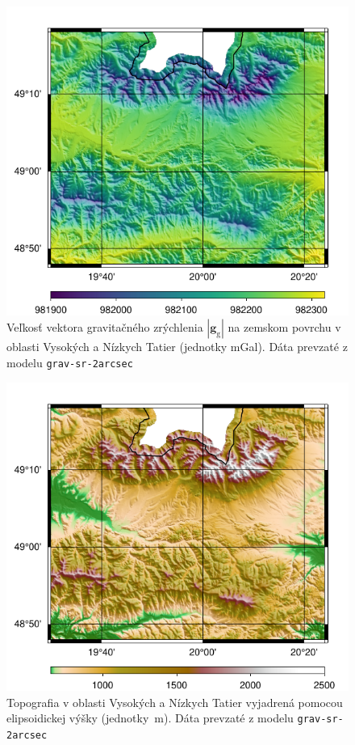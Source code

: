 \documentclass[a4paper, 12pt]{book}
\newcommand{\gidx}{\mathrm g}
\let\vec\mathbf
\begin{document}
\begin{figure}
\centering
\includegraphics{./fig-gg-grav-sr-2arcsec.pdf}
\caption{Veľkosť vektora gravitačného zrýchlenia $| \vec g_\gidx |$ na zemskom 
povrchu v oblasti Vysokých a Nízkych Tatier (jednotky mGal).  Dáta prevzaté 
z modelu \texttt{grav-sr-2arcsec} \citep{GravSR2arcsec}}
\label{fig:gg_grav_sr_2arcsec}
\end{figure}

\begin{figure}
\centering
\includegraphics{./fig-h-grav-sr-2arcsec.pdf}
\caption{Topografia v oblasti Vysokých a Nízkych Tatier vyjadrená pomocou 
elipsoidickej výšky (jednotky~m).  Dáta prevzaté z modelu 
\texttt{grav-sr-2arcsec} \citep{GravSR2arcsec}}
\label{fig:h_grav_sr_2arcsec}
\end{figure}
\end{document}
